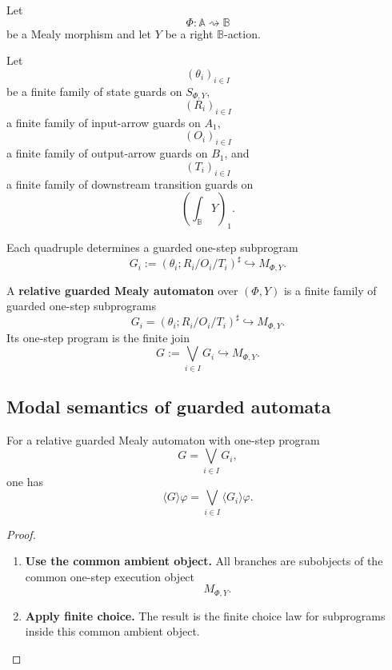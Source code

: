 Let
\[
\Phi:\mathbb A\rightsquigarrow\mathbb B
\]
be a Mealy morphism and let \(Y\) be a right \(\mathbb B\)-action.

Let
\[
(\theta_i)_{i\in I}
\]
be a finite family of state guards on \(S_{\Phi,Y}\),
\[
(R_i)_{i\in I}
\]
a finite family of input-arrow guards on \(A_1\),
\[
(O_i)_{i\in I}
\]
a finite family of output-arrow guards on \(B_1\), and
\[
(T_i)_{i\in I}
\]
a finite family of downstream transition guards on
\[
\left(\int_{\mathbb B}Y\right)_1.
\]

Each quadruple determines a guarded one-step subprogram
\[
G_i:=(\theta_i;R_i/O_i/T_i)^\sharp\hookrightarrow M_{\Phi,Y}.
\]

\begin{definition}
\label{def:poly-relative-guarded-mealy-automaton}
A \textbf{relative guarded Mealy automaton} over \((\Phi,Y)\) is a finite
family of guarded one-step subprograms
\[
G_i=(\theta_i;R_i/O_i/T_i)^\sharp\hookrightarrow M_{\Phi,Y}.
\]
Its one-step program is the finite join
\[
G:=\bigvee_{i\in I}G_i\hookrightarrow M_{\Phi,Y}.
\]
\end{definition}

\subsection{Modal semantics of guarded automata}
\label{subsec:poly-relative-guarded-automata-modal-semantics}

\begin{proposition}
\label{prop:poly-relative-guarded-automaton-diamond}
For a relative guarded Mealy automaton with one-step program
\[
G=\bigvee_{i\in I}G_i,
\]
one has
\[
\langle G\rangle\varphi
=
\bigvee_{i\in I}\langle G_i\rangle\varphi.
\]
\end{proposition}

\begin{proof}
\leavevmode
\begin{enumerate}
\item \textbf{Use the common ambient object.}
All branches are subobjects of the common one-step execution object
\[
M_{\Phi,Y}.
\]

\item \textbf{Apply finite choice.}
The result is the finite choice law for subprograms inside this common ambient
object.
\end{enumerate}
\end{proof}

